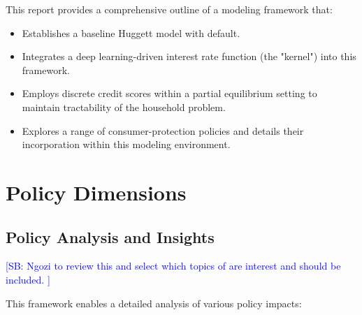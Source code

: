 \documentclass[acmsmall]{acmart}
\newcommand{\spb}[1]{\textcolor{blue}{[SB: #1]}}
\begin{document}
This report provides a comprehensive outline of a modeling framework that:
\begin{itemize}
    \item Establishes a baseline Huggett model with default.
    \item Integrates a deep learning-driven interest rate function (the "kernel") into this framework.
    \item Employs discrete credit scores within a partial equilibrium setting to maintain tractability of the household problem.
    \item Explores a range of consumer-protection policies and details their incorporation within this modeling environment.
\end{itemize}


\section{Policy Dimensions}


\subsection{Policy Analysis and Insights}
\spb{Ngozi to review this and select which topics of are interest and should be included. }


This framework enables a detailed analysis of various policy impacts:
\end{document}
